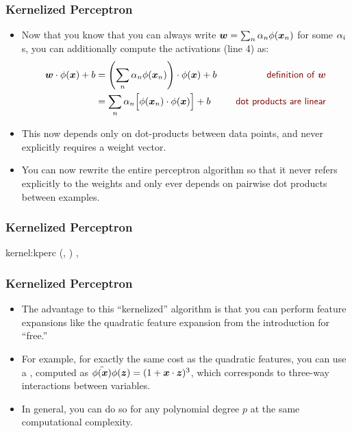 \documentclass[trans]{beamer}
\begin{document}
\begin{frame}
  \frametitle{Kernelized Perceptron}
\begin{itemize}
\item 
Now that you know that you can always write ${\boldsymbol{w}} = \sum_n \alpha_n
\phi({\boldsymbol{x}}_n)$ for some $\alpha_i$s, you can additionally compute the
activations (line 4) as:
%
\begin{align}
\dotp{\vw}{\phi(\vx)}+b
&= \dotp{\left( \sum_n \al_n \phi(\vx_n) \right)}{\phi(\vx)} + b
\becauseof{definition of $\vw$} \\
&= \sum_n \al_n \Big[ \dotp{\phi(\vx_n)}{\phi(\vx)} \Big] + b
\becauseof{dot products are linear}
\end{align}
%
\item This now depends only on dot-products between data points, and never
explicitly requires a weight vector.
\item  You can now rewrite the entire
perceptron algorithm so that it never refers explicitly to the weights
and only ever depends on pairwise dot products between examples.
\end{itemize}
\end{frame}
\begin{frame}
  \frametitle{Kernelized Perceptron}
\newalgorithm%
  {kernel:kperc}%
  {(, )}
  {
\ENDIF
\ENDFOR
\ENDFOR
\RETURN \VAR{$\vec\al$}, 
}
\end{frame}
\begin{frame}
  \frametitle{Kernelized Perceptron}
\begin{itemize}
\item 
The advantage to this ``kernelized'' algorithm is that you can perform
feature expansions like the quadratic feature expansion from the
introduction for ``free.''
\item  For example, for exactly the same cost as
the quadratic features, you can use a ,
computed as $\ddot{\phi({\boldsymbol{x}})}{\phi({\boldsymbol{z}})} = (1 + {\boldsymbol{x}} \cdot {\boldsymbol{z}})^3$,
which corresponds to three-way interactions between variables. 
\item In general, you can do so for any polynomial degree $p$ at the same
computational complexity.
\end{itemize}
\end{frame}
\end{document}
